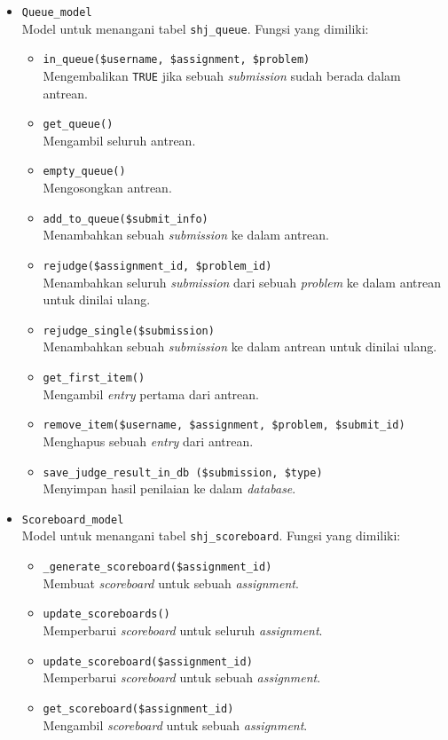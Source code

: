\begin{itemize}
	\item \verb|Queue_model| \\ Model untuk menangani tabel \verb|shj_queue|. Fungsi yang dimiliki:
	\begin{itemize}
	    \item \verb|in_queue($username, $assignment, $problem)| \\ Mengembalikan \verb|TRUE| jika sebuah \textit{submission} sudah berada dalam antrean.
	    \item \verb|get_queue()| \\ Mengambil seluruh antrean.
	    \item \verb|empty_queue()| \\ Mengosongkan antrean.
	    \item \verb|add_to_queue($submit_info)| \\ Menambahkan sebuah \textit{submission} ke dalam antrean.
	    \item \verb|rejudge($assignment_id, $problem_id)| \\ Menambahkan seluruh \textit{submission} dari sebuah \textit{problem} ke dalam antrean untuk dinilai ulang.
	    \item \verb|rejudge_single($submission)| \\  Menambahkan sebuah \textit{submission} ke dalam antrean untuk dinilai ulang.
	    \item \verb|get_first_item()| \\ Mengambil \textit{entry} pertama dari antrean.
	    \item \verb|remove_item($username, $assignment, $problem, $submit_id)| \\ Menghapus sebuah \textit{entry} dari antrean.
	    \item \verb|save_judge_result_in_db ($submission, $type)| \\ Menyimpan hasil penilaian ke dalam \textit{database}.
	\end{itemize}
	
	\item \verb|Scoreboard_model| \\ Model untuk menangani tabel \verb|shj_scoreboard|. Fungsi yang dimiliki:
	\begin{itemize}
	    \item \verb|_generate_scoreboard($assignment_id)| \\ Membuat \textit{scoreboard} untuk sebuah \textit{assignment}.
	    \item \verb|update_scoreboards()| \\ Memperbarui \textit{scoreboard} untuk seluruh \textit{assignment}.
	    \item \verb|update_scoreboard($assignment_id)| \\ Memperbarui \textit{scoreboard} untuk sebuah \textit{assignment}.
	    \item \verb|get_scoreboard($assignment_id)| \\ Mengambil \textit{scoreboard} untuk sebuah \textit{assignment}.
	\end{itemize}
	

\end{itemize}
